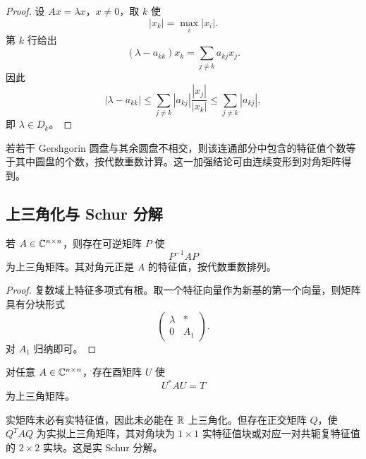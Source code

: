 \begin{proof}
设 $Ax=\lambda x$，$x\neq0$，取 $k$ 使
\begin{equation}
 |x_k|=\max_i|x_i|.
\end{equation}
第 $k$ 行给出
\begin{equation}
 (\lambda-a_{kk})x_k
 =\sum_{j\neq k}a_{kj}x_j.
\end{equation}
因此
\begin{equation}
 |\lambda-a_{kk}|
 \leq\sum_{j\neq k}|a_{kj}|
 \frac{|x_j|}{|x_k|}
 \leq\sum_{j\neq k}|a_{kj}|,
\end{equation}
即 $\lambda\in D_k$。
\end{proof}

\begin{remark}
若若干 Gershgorin 圆盘与其余圆盘不相交，则该连通部分中包含的特征值个数等于其中圆盘的个数，按代数重数计算。这一加强结论可由连续变形到对角矩阵得到。
\end{remark}

\subsection{上三角化与 Schur 分解}

\begin{theorem}
若 $A\in\mathbb C^{n\times n}$，则存在可逆矩阵 $P$ 使
\begin{equation}
 P^{-1}AP
\end{equation}
为上三角矩阵。其对角元正是 $A$ 的特征值，按代数重数排列。
\end{theorem}

\begin{proof}
复数域上特征多项式有根。取一个特征向量作为新基的第一个向量，则矩阵具有分块形式
\begin{equation}
 \begin{pmatrix}\lambda&*\\0&A_1\end{pmatrix}.
\end{equation}
对 $A_1$ 归纳即可。
\end{proof}

\begin{theorem}
对任意 $A\in\mathbb C^{n\times n}$，存在酉矩阵 $U$ 使
\begin{equation}
 U^*AU=T
\end{equation}
为上三角矩阵。
\end{theorem}

\begin{remark}
实矩阵未必有实特征值，因此未必能在 $\mathbb R$ 上三角化。但存在正交矩阵 $Q$，使 $Q^TAQ$ 为实拟上三角矩阵，其对角块为 $1\times1$ 实特征值块或对应一对共轭复特征值的 $2\times2$ 实块。这是实 Schur 分解。
\end{remark}
